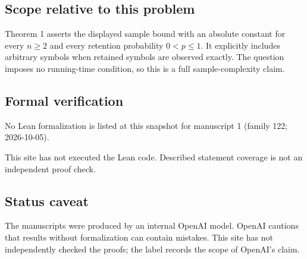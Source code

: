 \documentclass[11pt]{article}
\begin{document}
\subsection{Scope relative to this problem}
Theorem 1 asserts the displayed sample bound with an absolute constant for every $n\ge2$ and every retention probability $0<p\le1$. It explicitly includes arbitrary symbols when retained symbols are observed exactly. The question imposes no running-time condition, so this is a full sample-complexity claim.

\subsection{Formal verification}
No Lean formalization is listed at this snapshot for manuscript 1 (family 122; 2026-10-05).

This site has not executed the Lean code. Described statement coverage is not an independent proof check.

\subsection{Status caveat}
The manuscripts were produced by an internal OpenAI model. OpenAI cautions that results without formalization can contain mistakes. This site has not independently checked the proofs; the label records the scope of OpenAI's claim.
\end{document}
